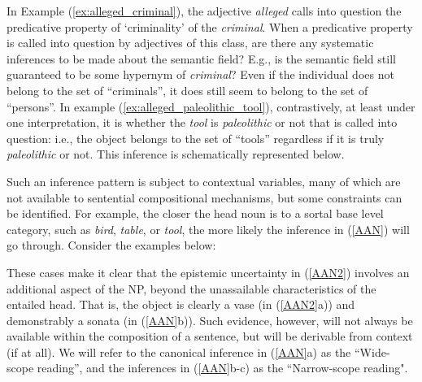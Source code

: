\documentclass[10pt]{article}
\begin{document}
\noindent 
In Example (\ref{ex:alleged_criminal}), the adjective \emph{alleged} calls into question the predicative property of `criminality' of the \emph{criminal}. When a predicative property is called into question by adjectives of this class, are
there any systematic inferences to be made about the semantic field? E.g., is the semantic field still guaranteed to be some hypernym of
\emph{criminal}? Even if the individual does not belong to the set of
``criminals'', it does still seem to belong to the set of ``persons''. In
example (\ref{ex:alleged_paleolithic_tool}), contrastively, at least under one
interpretation, it is whether the \emph{tool} is \emph{paleolithic} or not that
is called into question: i.e., the object belongs to the set of ``tools''
regardless if it is truly \emph{paleolithic} or not.
This inference is schematically represented below.

\vspace{-0.5em}
\vspace{-0.5em}


\noindent 
Such an inference pattern is subject to contextual variables, many of which are not available to sentential compositional mechanisms, but some constraints can be identified. For example, the closer the head noun is to a sortal base level category, such as  {\it bird}, {\it table}, or {\it tool}, the more likely the inference in (\ref{AAN}) will go through. 
Consider the examples below:

\vspace{-0.5em}


\vspace{-0.5em}


\noindent These cases make it clear that the epistemic uncertainty in (\ref{AAN2}) involves an additional aspect of the NP,  beyond the unassailable characteristics of the entailed head. That is, the object is clearly a vase (in (\ref{AAN2}a)) and demonstrably a sonata (in (\ref{AAN}b)). Such evidence, however, will not always be available within the composition of a sentence, but will be derivable from context (if at all).  We will refer to the canonical inference in (\ref{AAN}a) as the ``Wide-scope reading'', and the inferences in 
(\ref{AAN}b-c) as the ``Narrow-scope reading". 
\end{document}
